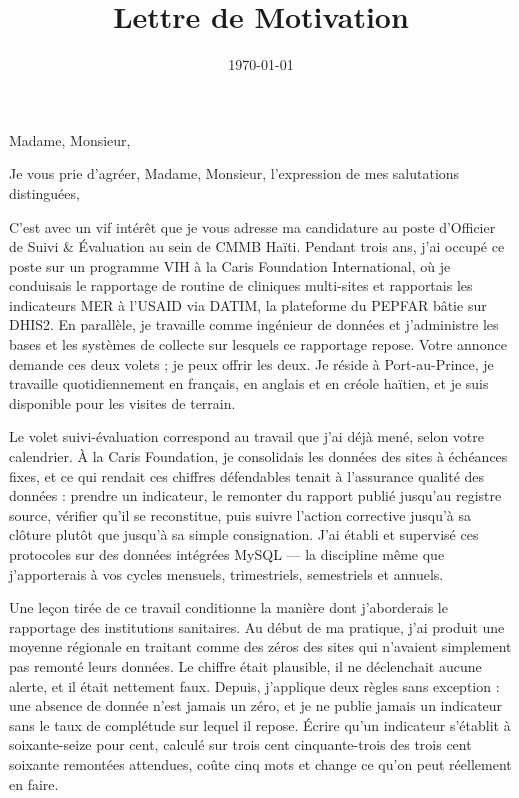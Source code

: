 \documentclass[11pt,a4paper,sans]{moderncv}
\title{Lettre de Motivation}
\begin{document}
\date{\today}
\opening{Madame, Monsieur,}
\closing{Je vous prie d'agréer, Madame, Monsieur, l'expression de mes salutations distinguées,}

\makelettertitle

C'est avec un vif intérêt que je vous adresse ma candidature au poste d'Officier de Suivi \& Évaluation au sein de CMMB Haïti. Pendant trois ans, j'ai occupé ce poste sur un programme VIH à la Caris Foundation International, où je conduisais le rapportage de routine de cliniques multi-sites et rapportais les indicateurs MER à l'USAID via DATIM, la plateforme du PEPFAR bâtie sur DHIS2. En parallèle, je travaille comme ingénieur de données et j'administre les bases et les systèmes de collecte sur lesquels ce rapportage repose. Votre annonce demande ces deux volets ; je peux offrir les deux. Je réside à Port-au-Prince, je travaille quotidiennement en français, en anglais et en créole haïtien, et je suis disponible pour les visites de terrain.

Le volet suivi-évaluation correspond au travail que j'ai déjà mené, selon votre calendrier. À la Caris Foundation, je consolidais les données des sites à échéances fixes, et ce qui rendait ces chiffres défendables tenait à l'assurance qualité des données : prendre un indicateur, le remonter du rapport publié jusqu'au registre source, vérifier qu'il se reconstitue, puis suivre l'action corrective jusqu'à sa clôture plutôt que jusqu'à sa simple consignation. J'ai établi et supervisé ces protocoles sur des données intégrées MySQL --- la discipline même que j'apporterais à vos cycles mensuels, trimestriels, semestriels et annuels.

Une leçon tirée de ce travail conditionne la manière dont j'aborderais le rapportage des institutions sanitaires. Au début de ma pratique, j'ai produit une moyenne régionale en traitant comme des zéros des sites qui n'avaient simplement pas remonté leurs données. Le chiffre était plausible, il ne déclenchait aucune alerte, et il était nettement faux. Depuis, j'applique deux règles sans exception : une absence de donnée n'est jamais un zéro, et je ne publie jamais un indicateur sans le taux de complétude sur lequel il repose. Écrire qu'un indicateur s'établit à soixante-seize pour cent, calculé sur trois cent cinquante-trois des trois cent soixante remontées attendues, coûte cinq mots et change ce qu'on peut réellement en faire.
\end{document}
